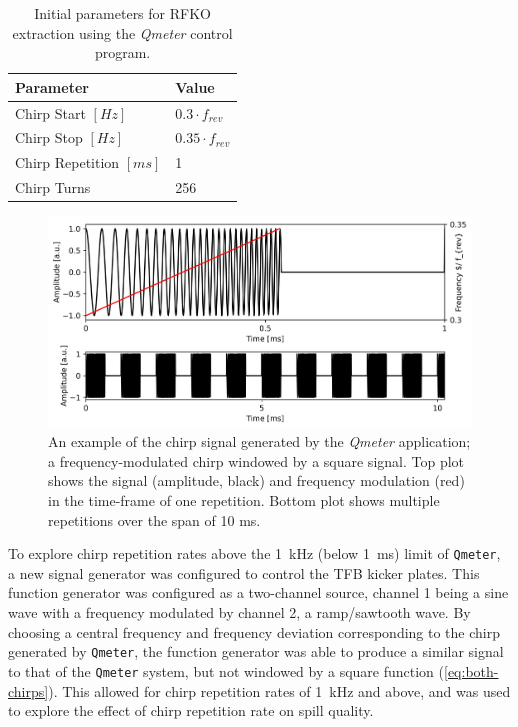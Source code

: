 \documentclass[11pt]{report}
\begin{document}
\begin{table}[]
  \centering
  \begin{tabular}{ll}
    \centering
  Parameter                 & Value                  \\ \hline \hline
  Chirp Start $[Hz]$        & $0.3\cdot f_{rev}$     \\
  Chirp Stop $[Hz]$         & $0.35\cdot f_{rev}$    \\
  Chirp Repetition $[ms]$   & 1                      \\
  Chirp Turns               & 256                   
  \end{tabular}
  \caption{Initial parameters for RFKO extraction using the \textit{Qmeter} control program.}\label{tab:qmeter-params}
\end{table}

\begin{figure}
  \centering
  \includegraphics[width=0.6\linewidth]{fake-signal.png}
  \caption{An example of the chirp signal generated by the \textit{Qmeter} application; a frequency-modulated chirp windowed by a square signal. Top plot shows the signal (amplitude, black) and frequency modulation (red) in the time-frame of one repetition. Bottom plot shows multiple repetitions over the span of 10 ms.}\label{fig:qmeter-signal}
\end{figure}

To explore chirp repetition rates above the \qty{1}{\kilo\hertz} (below \qty{1}{\milli\second}) limit of \verb|Qmeter|, a new signal generator was configured to control the TFB kicker plates. This function generator was configured as a two-channel source, channel 1 being a sine wave with a frequency modulated by channel 2, a ramp/sawtooth wave. By choosing a central frequency and frequency deviation corresponding to the chirp generated by \verb|Qmeter|, the function generator was able to produce a similar signal to that of the \verb|Qmeter| system, but not windowed by a square function (\autoref{eq:both-chirps}). This allowed for chirp repetition rates of \qty{1}{\kilo\hertz} and above, and was used to explore the effect of chirp repetition rate on spill quality.
\end{document}
